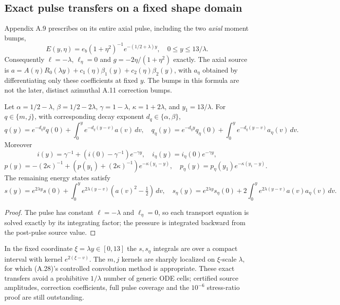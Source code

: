 \subsection*{Exact pulse transfers on a fixed shape domain}
Appendix A.9 prescribes on its entire axial pulse, including the
two \emph{axial} moment bumps,
\[
E(y,\eta)=e_b(1+\eta^2)^{-1}e^{-(1/2+\lambda)y},
\quad 0\le y\le13/\lambda.
\]
Consequently $\ell=-\lambda$, $\ell_\eta=0$ and
$g=-2\eta/(1+\eta^2)$ exactly. The axial source is
$a=A(\eta)R_0(\lambda y)+c_1(\eta)\beta_1(y)+c_2(\eta)\beta_2(y)$,
with $a_\eta$ obtained by differentiating only these coefficients
at fixed $y$. The bumps in this formula are not the later,
distinct azimuthal A.11 correction bumps.
\begin{proposition}
\label{prop:source-pulse-exact-transfer}
Let $\alpha=1/2-\lambda$, $\beta=1/2-2\lambda$,
$\gamma=1-\lambda$, $\kappa=1+2\lambda$,
and $y_1=13/\lambda$.
For $q\in\{m,j\}$, with corresponding decay exponent
$d_q\in\{\alpha,\beta\}$,
\[
q(y)=e^{-d_q y}q(0)+\int_0^ye^{-d_q(y-v)}a(v)\,dv,\quad
q_\eta(y)=e^{-d_q y}q_\eta(0)+
\int_0^ye^{-d_q(y-v)}a_\eta(v)\,dv.
\]
Moreover
\[
i(y)=\gamma^{-1}+(i(0)-\gamma^{-1})e^{-\gamma y},
\quad i_\eta(y)=i_\eta(0)e^{-\gamma y},
\]
\[
p(y)=-(2\kappa)^{-1}+
(p(y_1)+(2\kappa)^{-1})e^{-\kappa(y_1-y)},
\quad p_\eta(y)=p_\eta(y_1)e^{-\kappa(y_1-y)}.
\]
The remaining energy states satisfy
\[
s(y)=e^{2\lambda y}s(0)+\int_0^y e^{2\lambda(y-v)}
(a(v)^2-\tfrac12)\,dv,\quad
s_\eta(y)=e^{2\lambda y}s_\eta(0)+
2\int_0^y e^{2\lambda(y-v)}a(v)a_\eta(v)\,dv.
\]
\end{proposition}
\begin{proof}
The pulse has constant $\ell=-\lambda$ and
$\ell_\eta=0$, so each transport equation is solved
exactly by its integrating factor; the pressure is
integrated backward from the post-pulse source value.
\end{proof}
In the fixed coordinate $\xi=\lambda y\in[0,13]$ the
$s,s_\eta$ integrals are over a compact interval with
kernel $e^{2(\xi-v)}$. The $m,j$ kernels are sharply
localized on $\xi$-scale $\lambda$, for which (A.28)'s
controlled convolution method is appropriate.
These exact transfers avoid a prohibitive $1/\lambda$
number of generic ODE cells; certified source amplitudes,
correction coefficients, full pulse coverage and the
$10^{-6}$ stress-ratio proof are still outstanding.